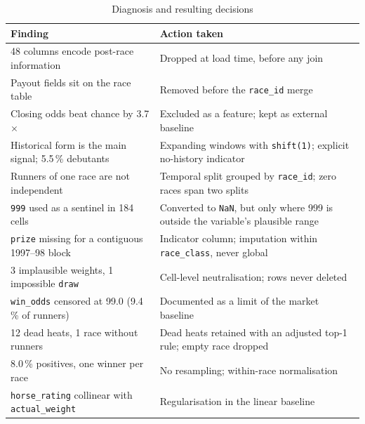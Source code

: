 \begin{table}[!t]
\centering
\caption{Diagnosis and resulting decisions}
\label{tab:acciones}
\scriptsize
\renewcommand{\arraystretch}{1.2}
\begin{tabular}{@{}p{3.4cm} p{4.2cm}@{}}
\toprule
\textbf{Finding} & \textbf{Action taken} \\
\midrule
48 columns encode post-race information &
Dropped at load time, before any join \\
Payout fields sit on the race table &
Removed before the \texttt{race\_id} merge \\
Closing odds beat chance by 3.7$\times$ &
Excluded as a feature; kept as external baseline \\
Historical form is the main signal; 5.5\,\% debutants &
Expanding windows with \texttt{shift(1)}; explicit no-history indicator \\
Runners of one race are not independent &
Temporal split grouped by \texttt{race\_id}; zero races span two splits \\
\texttt{999} used as a sentinel in 184 cells &
Converted to \texttt{NaN}, but only where 999 is outside the variable's plausible range \\
\texttt{prize} missing for a contiguous 1997--98 block &
Indicator column; imputation within \texttt{race\_class}, never global \\
3 implausible weights, 1 impossible \texttt{draw} &
Cell-level neutralisation; rows never deleted \\
\texttt{win\_odds} censored at 99.0 (9.4\,\% of runners) &
Documented as a limit of the market baseline \\
12 dead heats, 1 race without runners &
Dead heats retained with an adjusted top-1 rule; empty race dropped \\
8.0\,\% positives, one winner per race &
No resampling; within-race normalisation \\
\texttt{horse\_rating} collinear with \texttt{actual\_weight} &
Regularisation in the linear baseline \\
\bottomrule
\end{tabular}
\end{table}